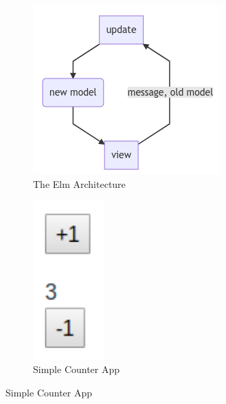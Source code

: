 \documentclass[sigconf]{acmart}
\begin{document}
\begin{figure}[h]
    \begin{subfigure}[b]{0.2\textwidth}
        \includegraphics[width=\textwidth]{elm-architecture}
        \caption{The Elm Architecture}
        \label{fig:Figure 1}
    \end{subfigure}
    \begin{subfigure}[b]{0.2\textwidth}
        \includegraphics[width=0.3\textwidth]{counter}
        \centering
        \caption{Simple Counter App}
        \label{fig:Figure 2}
    \end{subfigure}
\end{figure}
\end{document}
